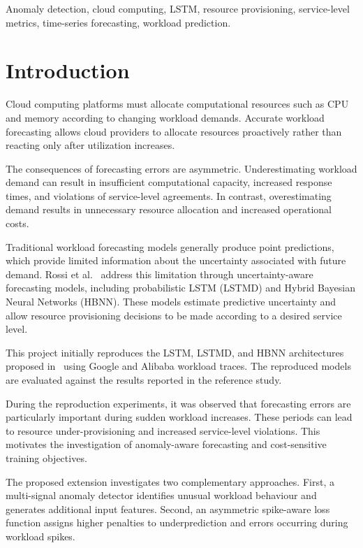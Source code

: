 \documentclass[conference]{IEEEtran}
\begin{document}
\begin{IEEEkeywords}
Anomaly detection, cloud computing, LSTM, resource provisioning, service-level metrics, time-series forecasting, workload prediction.
\end{IEEEkeywords}

\section{Introduction}

Cloud computing platforms must allocate computational resources such as CPU and memory according to changing workload demands. Accurate workload forecasting allows cloud providers to allocate resources proactively rather than reacting only after utilization increases.

The consequences of forecasting errors are asymmetric. Underestimating workload demand can result in insufficient computational capacity, increased response times, and violations of service-level agreements. In contrast, overestimating demand results in unnecessary resource allocation and increased operational costs.

Traditional workload forecasting models generally produce point predictions, which provide limited information about the uncertainty associated with future demand. Rossi et al.~\cite{rossi2025} address this limitation through uncertainty-aware forecasting models, including probabilistic LSTM (LSTMD) and Hybrid Bayesian Neural Networks (HBNN). These models estimate predictive uncertainty and allow resource provisioning decisions to be made according to a desired service level.

This project initially reproduces the LSTM, LSTMD, and HBNN architectures proposed in~\cite{rossi2025} using Google and Alibaba workload traces. The reproduced models are evaluated against the results reported in the reference study.

During the reproduction experiments, it was observed that forecasting errors are particularly important during sudden workload increases. These periods can lead to resource under-provisioning and increased service-level violations. This motivates the investigation of anomaly-aware forecasting and cost-sensitive training objectives.

The proposed extension investigates two complementary approaches. First, a multi-signal anomaly detector identifies unusual workload behaviour and generates additional input features. Second, an asymmetric spike-aware loss function assigns higher penalties to underprediction and errors occurring during workload spikes.
\end{document}
